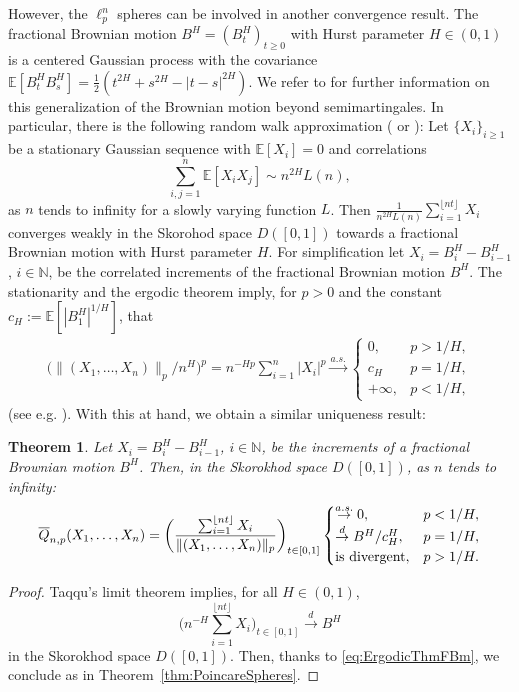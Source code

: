 \documentclass[numbers,compress,v1.0.1]{vmsta}
\newtheorem{theorem}{Theorem}
\theoremstyle{definition}
\def\N{\mathbb{N}}
\def\ex{\mathbb{E}}
\begin{document}
However, the $\ell^n_p$ spheres can be involved in another convergence
result. The fractional Brownian motion $B^H=(B^H_t)_{t \geq0}$ with
Hurst parameter $H \in(0,1)$ is a centered Gaussian process with the
covariance $\ex[B^H_t B^H_s] = \frac{1}{2}(t^{2H}+s^{2H}-|t-s|^{2H})$.
We refer to \cite{Mishura} for further information on this
generalization of the Brownian motion beyond semimartingales. In
particular, there is the following random walk approximation (\cite[Theorem~2.1]{Taqqu} or \cite[Lemma~1.15.9]{Mishura}): Let $\{X_i\}_{i
\geq1}$ be a stationary Gaussian sequence with $\ex[X_i]=0$ and correlations
%
\[
\sum_{i,j =1}^{n} \ex[X_i
X_j] \sim n^{2H} L(n),
\]
%
as $n$ tends to infinity for a slowly varying function $L$. Then $\frac
{1}{n^{2H} L(n)}\sum_{i=1}^{\lfloor nt \rfloor}X_i$ converges weakly in
the Skorohod space $D([0,1])$ towards a fractional Brownian motion with
Hurst parameter $H$. For simplification let $X_i = B^H_i - B^H_{i-1}$,
$i \in\N$, be the correlated increments of the fractional Brownian
motion $B^H$. The stationarity and the ergodic theorem imply, for $p>0$
and the constant $c_H:= \ex[|B^H_1|^{1/H}]$, that
%
\begin{align}
\label{eq:ErgodicThmFBm}
\bigl(\bigl\|(X_1,\ldots, X_n)\bigr\|_p/n^{H} \bigr)^p= n^{-Hp} \sum
_{i=1}^{n} |X_i|^p
\stackrel{a.s.} {\rightarrow} %
\begin{cases} 0, & p>1/H,\\ c_H &p=1/H,\\ +\infty, & p<1/H,
\end{cases} %
\end{align}
%
(see e.g. \cite[Eq. (1.18.3)]{Mishura}). With this at hand, we obtain a
similar uniqueness result:

\begin{theorem}\label{thm:DonskerSelfNormalizedFbm}
Let $X_i = B^H_i - B^H_{i-1}$, $i \in\N$, be the increments of a
fractional Brownian motion $B^H$. Then, in the Skorokhod space
$D([0,1])$, as $n$ tends to infinity:
%
\[
\overline{Q}_{n,p}(X_1,\ldots, X_n) = \biggl(
\frac{\sum_{i=1}^{\lfloor
nt \rfloor} X_i}{\|(X_1,\ldots, X_n)\|_p} \biggr)_{t \in[0,1]} %
\begin{cases} \stackrel{a.s.}{\rightarrow} 0, &p <1/H,\\
\stackrel{d}{\rightarrow} B^H/c_H^H, &p=1/H,\\
\textnormal{is divergent}, &p>1/H.
\end{cases} %
\]
%
\end{theorem}

\begin{proof}
Taqqu's limit theorem implies, for all $H \in(0,1)$,
%
\[
\Biggl(n^{-H}\sum_{i=1}^{\lfloor nt \rfloor}
X_i \Biggr)_{t \in[0,1]} \stackrel{d} {\rightarrow}
B^H
\]
%
in the Skorokhod space $D([0,1])$. Then, thanks to \eqref {eq:ErgodicThmFBm},
we conclude as in Theorem~\ref{thm:PoincareSpheres}.
\end{proof}
\end{document}
